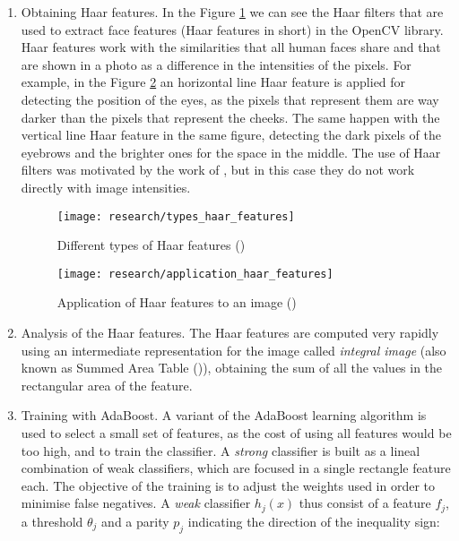 	\begin{enumerate}
		\item Obtaining Haar features. In the Figure \ref{fig:haar_features} we can see the Haar filters that are used to extract face features (Haar features in short) in the OpenCV library. Haar features work with the similarities that all human faces share and that are shown in a photo as a difference in the intensities of the pixels. For example, in the Figure \ref{fig:application_haar_features} an horizontal line Haar feature is applied for detecting the position of the eyes, as the pixels that represent them are way darker than the pixels that represent the cheeks. The same happen with the vertical line Haar feature in the same figure, detecting the dark pixels of the eyebrows and the brighter ones for the space in the middle. The use of Haar filters was motivated by the work of \cite{haar_features_before_vj}, but in this case they do not work directly with image intensities. 

		\begin{figure}[!ht]
			\centering
			\texttt{[image: research/types\_haar\_features]}
			\caption{Different types of Haar features (\cite{opencv_haar_cascade_tut})}
			\label{fig:haar_features}
		\end{figure}

		\begin{figure}[!ht]
			\centering
			\texttt{[image: research/application\_haar\_features]}
			\caption{Application of Haar features to an image (\cite{viola2001rapid})}
			\label{fig:application_haar_features}
		\end{figure}

		\item Analysis of the Haar features. The Haar features are computed very rapidly using an intermediate representation for the image called \textit{integral image} (also known as Summed Area Table (\cite{crow_summed_table})), obtaining the sum of all the values in the rectangular area of the feature. 

		\item Training with AdaBoost. A variant of the AdaBoost learning algorithm is used to select a small set of features, as the cost of using all features would be too high, and to train the classifier. A \textit{strong} classifier is built as a lineal combination of weak classifiers, which are focused in a single rectangle feature each. The objective of the training is to adjust the weights used in order to minimise false negatives. A \textit{weak} classifier $h_j(x)$ thus consist of a feature $f_j$, a threshold $\theta_j$ and a parity $p_j$ indicating the direction of the inequality sign:


\end{enumerate}
